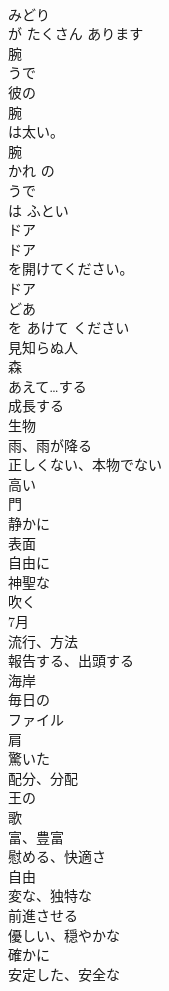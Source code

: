 \documentclass[8pt]{extreport}
\begin{document}
\begin{CJK}{UTF8}{min}
\\	みどり
\\	が たくさん あります	
\\	腕	
\\	うで	
\\	彼の
\\	腕
\\	は太い。	
\\	腕 
\\	かれ の 
\\	うで
\\	は ふとい	
\\	ドア	
\\	ドア
\\	を開けてください。	
\\	ドア 
\\	どあ
\\	を あけて ください	
\\	見知らぬ人	
\\	森	
\\	あえて…する	
\\	成長する	
\\	生物	
\\	雨、雨が降る	
\\	正しくない、本物でない	
\\	高い	
\\	門	
\\	静かに	
\\	表面	
\\	自由に	
\\	神聖な	
\\	吹く	
\\	7月	
\\	流行、方法	
\\	報告する、出頭する	
\\	海岸	
\\	毎日の	
\\	ファイル	
\\	肩	
\\	驚いた	
\\	配分、分配	
\\	王の	
\\	歌	
\\	富、豊富	
\\	慰める、快適さ	
\\	自由	
\\	変な、独特な	
\\	前進させる	
\\	優しい、穏やかな	
\\	確かに	
\\	安定した、安全な	

\end{CJK}
\end{document}
